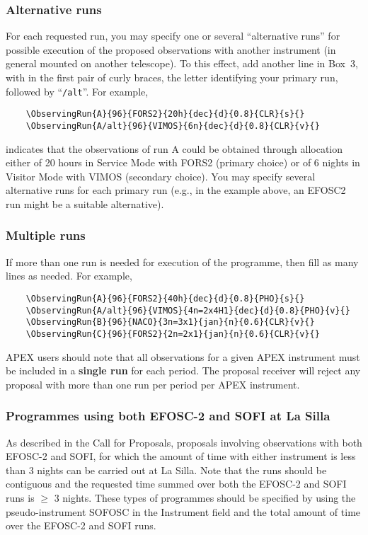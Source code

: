 \documentclass{article}
\begin{document}
\subsubsection*{Alternative runs}
For each requested run, you may specify one or several
``alternative runs'' for possible execution of the proposed
observations with another instrument (in general mounted on another
telescope). To this effect, add another line in Box~3, with in the
first pair of curly braces, the letter identifying your primary run,
followed by ``\verb|/alt|''. For example,
\begin{verbatim}
    \ObservingRun{A}{96}{FORS2}{20h}{dec}{d}{0.8}{CLR}{s}{}
    \ObservingRun{A/alt}{96}{VIMOS}{6n}{dec}{d}{0.8}{CLR}{v}{}
\end{verbatim}
indicates that the observations of run A could be obtained
through allocation either of 20 hours in Service Mode with FORS2
(primary choice) or of 6 nights in Visitor Mode with VIMOS (secondary
choice). You may specify several alternative runs for each primary run
(e.g., in the example above, an EFOSC2 run might be a suitable alternative).

\subsubsection*{Multiple runs}
If more than one run is needed for execution of
the programme, then fill as many lines as needed.  For example,
\begin{verbatim} 
    \ObservingRun{A}{96}{FORS2}{40h}{dec}{d}{0.8}{PHO}{s}{}
    \ObservingRun{A/alt}{96}{VIMOS}{4n=2x4H1}{dec}{d}{0.8}{PHO}{v}{}
    \ObservingRun{B}{96}{NACO}{3n=3x1}{jan}{n}{0.6}{CLR}{v}{}
    \ObservingRun{C}{96}{FORS2}{2n=2x1}{jan}{n}{0.6}{CLR}{v}{}
\end{verbatim}

APEX users should note that all observations for a given APEX
instrument must be included in a {\bf single run} for each period. The proposal
receiver 
will reject any proposal with more than one run per period per APEX instrument. 

\subsubsection*{Programmes using both EFOSC-2 and SOFI at La Silla}
\label{sec:sofiefosc}

As described in the Call for Proposals,
proposals involving observations with both EFOSC-2 and SOFI,
for which the amount of time with either instrument is less than
3 nights can be carried out at La Silla.
Note that the runs should be contiguous and the requested time
summed over both the EFOSC-2 and SOFI runs is $\ge$ 3 nights.
These types of programmes should be specified
by using the pseudo-instrument SOFOSC in the Instrument field and
the total amount of time over the EFOSC-2 and SOFI runs.
\end{document}
